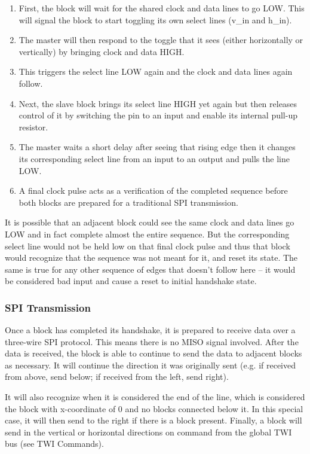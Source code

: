 \documentclass[12pt,a4paper]{article}
\begin{document}
 \begin{enumerate}
 	\item First, the block will wait for the shared clock and data lines to go LOW. This will signal the block to start toggling its own select lines (v\_in and h\_in). 
 	\item The master will then respond to the toggle that it sees (either horizontally or vertically) by bringing clock and data HIGH. 
 	\item This triggers the select line LOW again and the clock and data lines again follow. 
 	\item Next, the slave block brings its select line HIGH yet again but then releases control of it by switching the pin to an input and enable its internal pull-up resistor. 
 	\item The master waits a short delay after seeing that rising edge then it changes its corresponding select line from an input to an output and pulls the line LOW. 
 	\item A final clock pulse acts as a verification of the completed sequence before both blocks are prepared for a traditional SPI transmission.
 \end{enumerate}
 
 It is possible that an adjacent block could see the same clock and data lines go LOW and in fact complete almost the entire sequence. But the corresponding select line would not be held low on that final clock pulse and thus that block would recognize that the sequence was not meant for it, and reset its state. The same is true for any other sequence of edges that doesn't follow here -- it would be considered bad input and cause a reset to initial handshake state.
 \subsubsection{SPI Transmission}
 Once a block has completed its handshake, it is prepared to receive data over a three-wire SPI protocol. This means there is no MISO signal involved. After the data is received, the block is able to continue to send the data to adjacent blocks as necessary. It will continue the direction it was originally sent (e.g. if received from above, send below; if received from the left, send right). 
 
 
 It will also recognize when it is considered the \textquotesingle end of the line\textquotesingle  , which is considered the block with x-coordinate of 0 and no blocks connected below it. In this special case, it will then send to the right if there is a block present. 
 Finally, a block will send in the vertical or horizontal directions on command from the global TWI bus (see TWI Commands). 
 
\end{document}

